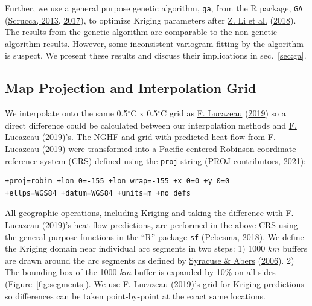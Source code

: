 \documentclass[draft,linenumbers]{agujournal2018}
\begin{document}
Further, we use a general purpose genetic algorithm, \texttt{ga}, from
the R package, \texttt{GA} (\protect\hyperlink{ref-scrucca2013}{Scrucca,
2013}, \protect\hyperlink{ref-scrucca2017}{2017}), to optimize Kriging
parameters after \protect\hyperlink{ref-li2018}{Z. Li et al.}
(\protect\hyperlink{ref-li2018}{2018}). The results from the genetic
algorithm are comparable to the non-genetic-algorithm results. However,
some inconsistent variogram fitting by the algorithm is suspect. We
present these results and discuss their implications in
sec.~\ref{sec:ga}.

\subsection{Map Projection and Interpolation Grid}

We interpolate onto the same 0.5\(^{\circ}\)C x 0.5\(^{\circ}\)C grid as
\protect\hyperlink{ref-lucazeau2019}{F. Lucazeau}
(\protect\hyperlink{ref-lucazeau2019}{2019}) so a direct difference
could be calculated between our interpolation methods and
\protect\hyperlink{ref-lucazeau2019}{F. Lucazeau}
(\protect\hyperlink{ref-lucazeau2019}{2019})'s. The NGHF and grid with
predicted heat flow from \protect\hyperlink{ref-lucazeau2019}{F.
Lucazeau} (\protect\hyperlink{ref-lucazeau2019}{2019}) were transformed
into a Pacific-centered Robinson coordinate reference system (CRS)
defined using the \texttt{proj} string
(\protect\hyperlink{ref-proj2021}{PROJ contributors, 2021}):

\begin{verbatim}
+proj=robin +lon_0=-155 +lon_wrap=-155 +x_0=0 +y_0=0
+ellps=WGS84 +datum=WGS84 +units=m +no_defs
\end{verbatim}

All geographic operations, including Kriging and taking the difference
with \protect\hyperlink{ref-lucazeau2019}{F. Lucazeau}
(\protect\hyperlink{ref-lucazeau2019}{2019})'s heat flow predictions,
are performed in the above CRS using the general-purpose functions in
the ``R'' package \texttt{sf}
(\protect\hyperlink{ref-pebesma2018}{Pebesma, 2018}). We define the
Kriging domain near individual arc segments in two steps: 1) 1000 \(km\)
buffers are drawn around the arc segments as defined by
\protect\hyperlink{ref-syracuse2006}{Syracuse \& Abers}
(\protect\hyperlink{ref-syracuse2006}{2006}). 2) The bounding box of the
1000 \(km\) buffer is expanded by 10\% on all sides
(Figure~\ref{fig:segments}). We use
\protect\hyperlink{ref-lucazeau2019}{F. Lucazeau}
(\protect\hyperlink{ref-lucazeau2019}{2019})'s grid for Kriging
predictions so differences can be taken point-by-point at the exact same
locations.
\end{document}
